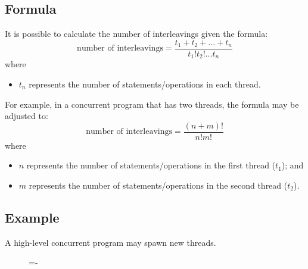 \documentclass[a4paper]{systems-software}
\begin{document}
\subsection*{Formula}

It is possible to calculate the number of interleavings given the formula:
\begin{equation*}
	\text{number of interleavings} = \frac{t_{1} + t_{2} + ... + t_{n}}{t_{1}!t_{2}!...t_{n}}
\end{equation*}
where
\begin{itemize}
	\item $t_{n}$ represents the number of statements/operations in each thread.
\end{itemize}

For example, in a concurrent program that has two threads, the formula may be adjusted to:
\begin{equation*}
	\text{number of interleavings} = \frac{(n + m)!}{n!m!}
\end{equation*}
where
\begin{itemize}
	\item $n$ represents the number of statements/operations in the first thread ($t_{1}$); and
	\item $m$ represents the number of statements/operations in the second thread ($t_{2}$).
\end{itemize}


\subsection*{Example}

A high-level concurrent program may spawn new threads.

\begin{figure}[H]
  \lineskip=-\fboxrule
\end{figure}
\end{document}
